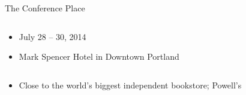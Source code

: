 \documentclass[17pt,dvipdfmx]{beamer}
\begin{document}
\begin{frame}[t]{The Conference Place}
  \bfseries\rmfamily
  \begin{columns}[t]
    \begin{column}{.7\textwidth}
    \begin{itemize}
      \item July 28 -- 30, 2014
      \item Mark Spencer Hotel in Downtown Portland
    \end{itemize}
    \end{column}
  \end{columns}
  \begin{columns}[t]
    \begin{column}{.6\textwidth}
      \setlength{\leftmargini}{24pt}
      \begin{itemize}
        \item Close to the world's biggest independent bookstore; Powell's
      \end{itemize}
    \end{column}
    \begin{column}{.4\textwidth}
    \vfill

\end{column}
\end{columns}
\end{frame}
\end{document}
